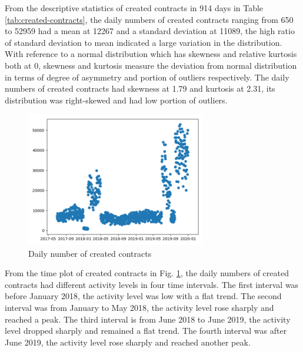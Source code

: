 From the descriptive statistics of created contracts in 914 days in Table \ref{tab:created-contracts}, the daily numbers of created contracts ranging from 650 to 52959 had a mean at 12267 and a standard deviation at 11089, the high ratio of standard deviation to mean indicated a large variation in the distribution. With reference to a normal distribution which has skewness and relative kurtosis both at 0, skewness and kurtosis measure the deviation from normal distribution in terms of degree of asymmetry and portion of outliers respectively. The daily numbers of created contracts had skewness at 1.79 and kurtosis at 2.31, its distribution was right-skewed and had low portion of outliers.

\begin{figure}[htb]
\includegraphics[width=0.7\textwidth]{gfx/created-contracts.png}
\caption{Daily number of created contracts}
\label{fig:created-contracts}
\end{figure}

From the time plot of created contracts in Fig. \ref{fig:created-contracts}, the daily numbers of created contracts had different activity levels in four time intervals. The first interval was before January 2018, the activity level was low with a flat trend. The second interval was from January to May 2018, the activity level rose sharply and reached a peak. The third interval is from June 2018 to June 2019, the activity level dropped sharply and remained a flat trend. The fourth interval was after June 2019, the activity level rose sharply and reached another peak.

